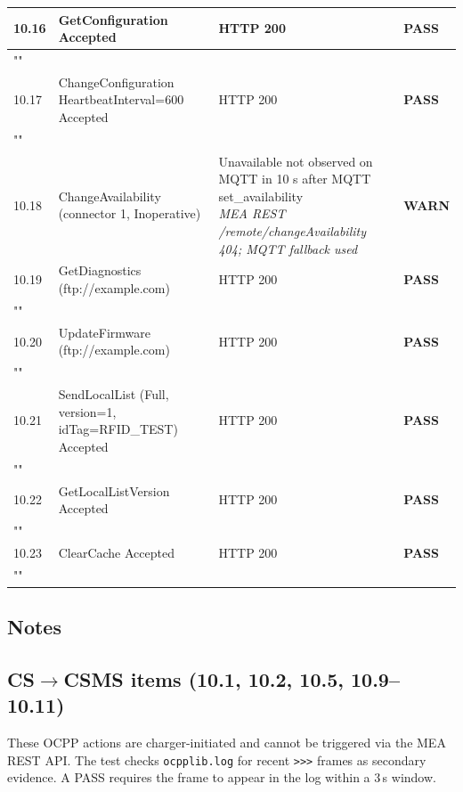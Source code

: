 \documentclass[10pt, a4paper]{article}
\begin{document}
\begin{longtable}{|L{1cm}|L{5.5cm}|M{7cm}|C{1.8cm}|}
\hline
\small 10.16 & \small GetConfiguration  Accepted & HTTP 200 & \textcolor{passgreen}{\textbf{PASS}} \\
\hline
{} \\
\hline
\small 10.17 & \small ChangeConfiguration HeartbeatInterval=600  Accepted & HTTP 200 & \textcolor{passgreen}{\textbf{PASS}} \\
\hline
{} \\
\hline
\small 10.18 & \small ChangeAvailability (connector 1, Inoperative) & Unavailable not observed on MQTT in 10 s after MQTT set\_availability{\newline\normalfont\footnotesize\itshape MEA REST /remote/changeAvailability  404; MQTT fallback used} & \textcolor{warnorange}{\textbf{WARN}} \\
\hline
\small 10.19 & \small GetDiagnostics (ftp://example.com) & HTTP 200 & \textcolor{passgreen}{\textbf{PASS}} \\
\hline
{} \\
\hline
\small 10.20 & \small UpdateFirmware (ftp://example.com) & HTTP 200 & \textcolor{passgreen}{\textbf{PASS}} \\
\hline
{} \\
\hline
\small 10.21 & \small SendLocalList (Full, version=1, idTag=RFID\_TEST)  Accepted & HTTP 200 & \textcolor{passgreen}{\textbf{PASS}} \\
\hline
{} \\
\hline
\small 10.22 & \small GetLocalListVersion  Accepted & HTTP 200 & \textcolor{passgreen}{\textbf{PASS}} \\
\hline
{} \\
\hline
\small 10.23 & \small ClearCache  Accepted & HTTP 200 & \textcolor{passgreen}{\textbf{PASS}} \\
\hline
{} \\
\hline
\end{longtable}
\normalsize
\subsection*{Notes}

\subsection*{CS\(\to\)CSMS items (10.1, 10.2, 10.5, 10.9--10.11)}
These OCPP actions are charger-initiated and cannot be triggered via the MEA REST API.
The test checks \texttt{ocpplib.log} for recent \texttt{>>>} frames as secondary evidence.
A PASS requires the frame to appear in the log within a 3\,s window.
\end{document}
